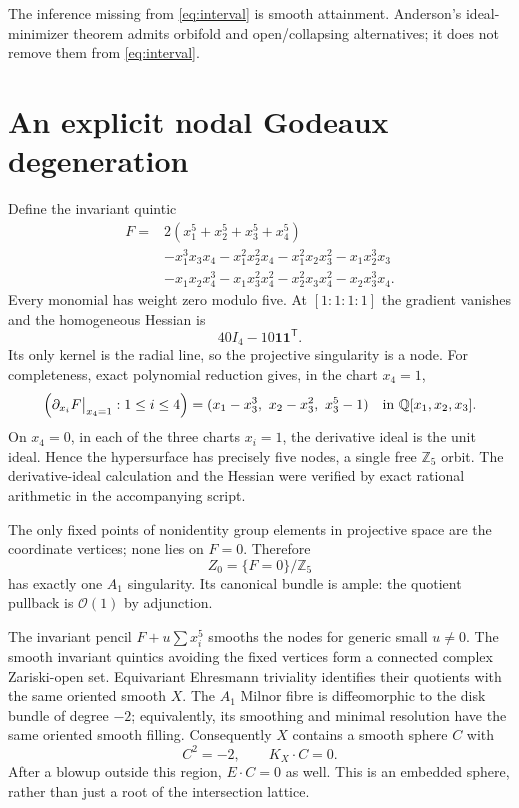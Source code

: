 \documentclass[11pt]{article}
\begin{document}
The inference missing from \eqref{eq:interval} is smooth attainment.
Anderson's ideal-minimizer theorem \cite{Anderson} admits orbifold and
open/collapsing alternatives; it does not remove them from
\eqref{eq:interval}.

\section{An explicit nodal Godeaux degeneration}
Define the invariant quintic
\begin{align*}
 F={}&2(x_1^5+x_2^5+x_3^5+x_4^5)\\
 &-x_1^3x_3x_4-x_1^2x_2^2x_4-x_1^2x_2x_3^2-x_1x_2^3x_3\\
 &-x_1x_2x_4^3-x_1x_3^2x_4^2-x_2^2x_3x_4^2-x_2x_3^3x_4.
\end{align*}
Every monomial has weight zero modulo five. At $[1:1:1:1]$ the gradient
vanishes and the homogeneous Hessian is
\[
 40I_4-10\mathbf 1\mathbf 1^{\mathsf T}.
\]
Its only kernel is the radial line, so the projective singularity is a node.
For completeness, exact polynomial reduction gives, in the chart $x_4=1$,
\[
 \left(\partial_{x_i}F\big|_{x_4=1}:1\le i\le4\right)
 = (x_1-x_3^3,\ x_2-x_3^2,\ x_3^5-1)
 \quad\hbox{in }\mathbb Q[x_1,x_2,x_3].
\]
On $x_4=0$, in each of the three charts $x_i=1$, the derivative ideal is
the unit ideal. Hence the hypersurface has precisely five nodes, a single
free $\mathbb Z_5$ orbit. The derivative-ideal calculation and the Hessian
were verified by exact rational arithmetic in the accompanying script.

The only fixed points of nonidentity group elements in projective space
are the coordinate vertices; none lies on $F=0$. Therefore
\[
 Z_0=\{F=0\}/\mathbb Z_5
\]
has exactly one $A_1$ singularity. Its canonical bundle is ample:
the quotient pullback is $\mathcal O(1)$ by adjunction.

The invariant pencil $F+u\sum x_i^5$ smooths the nodes for generic small
$u\ne0$. The smooth invariant quintics avoiding the fixed vertices form
a connected complex Zariski-open set. Equivariant Ehresmann triviality
identifies their quotients with the same oriented smooth $X$.
The $A_1$ Milnor fibre is diffeomorphic to the disk bundle of degree $-2$;
equivalently, its smoothing and minimal resolution have the same oriented
smooth filling. Consequently $X$ contains a smooth sphere $C$ with
\[
 C^2=-2,\qquad K_X\cdot C=0.
\]
After a blowup outside this region, $E\cdot C=0$ as well. This is an
embedded sphere, rather than just a root of the intersection lattice.
\end{document}
